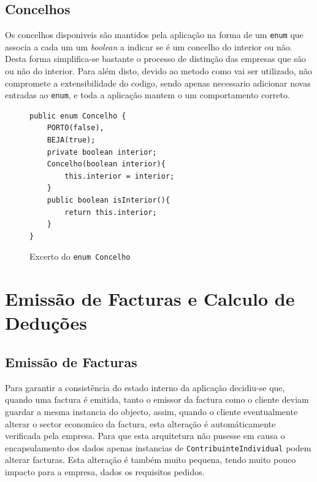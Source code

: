 \documentclass[12pt,a4paper]{report}
\begin{document}
\section{Concelhos}
\label{sec:concelho}
    Os concelhos disponiveis são mantidos pela aplicação na forma de um
    \texttt{enum} que associa a cada um um \textit{boolean} a indicar se
    é um concelho do interior ou não. Desta forma simplifica-se bastante o processo
    de distinção das empresas que são ou não do interior. Para além disto, devido
    ao metodo como vai ser utilizado, não compromete a extensibilidade do codigo,
    sendo apenas necessario adicionar novas entradas ao \texttt{enum}, e
    toda a aplicação mantem o um comportamento correto.

    \begin{figure}[h]
        \begin{verbatim}
public enum Concelho {
    PORTO(false),
    BEJA(true);
    private boolean interior;
    Concelho(boolean interior){
        this.interior = interior;
    }
    public boolean isInterior(){
        return this.interior;
    }
}
        \end{verbatim}
        \caption{Excerto do \texttt{enum Concelho}}
        \label{fig:concelhos}
    \end{figure}

\chapter{Emissão de Facturas e Calculo de Deduções}
\label{chp:emissao}

\section{Emissão de Facturas}
    Para garantir a consistência do estado interno da aplicação decidiu-se que,
    quando uma factura é emitida, tanto o emissor da factura como o cliente
    deviam guardar a mesma instancia do objecto, assim, quando o cliente
    eventualmente alterar o sector economico da factura, esta alteração é
    automáticamente verificada pela empresa. Para que esta arquitetura não
    pusesse em causa o encapsulamento dos dados apenas instancias de
    \texttt{ContribuinteIndividual} podem alterar facturas. Esta
    alteração é também muito pequena, tendo muito pouco impacto para a empresa,
    dados os requisitos pedidos.
\end{document}
